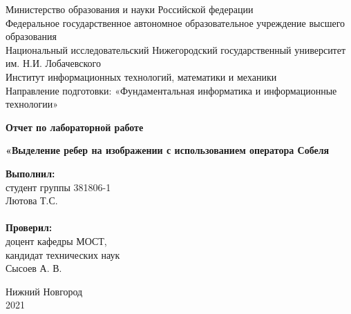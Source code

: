 \documentclass{report}
\begin{document}
\begin{titlepage}
\begin{center}
Министерство образования и науки Российской федерации \\
Федеральное государственное автономное образовательное учреждение высшего образования \\
Национальный исследовательский Нижегородский государственный университет им. Н.И. Лобачевского \\
Институт информационных технологий, математики и механики \\
Направление подготовки: «Фундаментальная информатика и информационные технологии»
\end{center}

\vspace{4em}

\begin{center}
\textbf{\Large Отчет по лабораторной работе}
\end{center}
\begin{center}
\textbf{\Large «Выделение ребер на изображении с использованием оператора Собеля}
\end{center}

\vspace{4em}

\newbox{\lbox}
\newlength{\maxl}
\setlength{\maxl}{\wd\lbox}
\hfill\parbox{7cm}{
\textbf{Выполнил:} \\ 
студент группы 381806-1 \\ 
Лютова Т.С.\\
\\
\textbf{Проверил:}\\ 
доцент кафедры МОСТ, \\ 
кандидат технических наук \\ 
Сысоев А. В.\\ }
\vspace{\fill}

\begin{center} Нижний Новгород \\ 2021 \end{center}

\end{titlepage}

\setcounter{page}{2}
\tableofcontents
\newpage

\end{document}
